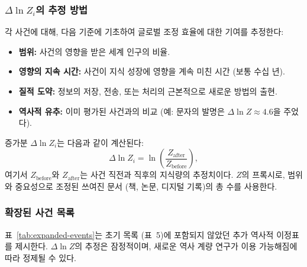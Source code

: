 \documentclass[12pt,a4paper]{article}
\theoremstyle{remark}
\begin{document}
	\subsubsection{\(\Delta \ln Z_i\)의 추정 방법}
	
	각 사건에 대해, 다음 기준에 기초하여 글로벌 조정 효율에 대한 기여를 추정한다:
	\begin{itemize}
		\item \textbf{범위:} 사건의 영향을 받은 세계 인구의 비율.
		\item \textbf{영향의 지속 시간:} 사건이 지식 성장에 영향을 계속 미친 시간 (보통 수십 년).
		\item \textbf{질적 도약:} 정보의 저장, 전송, 또는 처리의 근본적으로 새로운 방법의 출현.
		\item \textbf{역사적 유추:} 이미 평가된 사건과의 비교 (예: 문자의 발명은 \(\Delta \ln Z \approx 4.6\)을 주었다).
	\end{itemize}
	증가분 \(\Delta \ln Z_i\)는 다음과 같이 계산된다:
	\[
	\Delta \ln Z_i = \ln\left(\frac{Z_{\text{after}}}{Z_{\text{before}}}\right),
	\]
	여기서 \(Z_{\text{before}}\)와 \(Z_{\text{after}}\)는 사건 직전과 직후의 지식량의 추정치이다. \(Z\)의 프록시로, 범위와 중요성으로 조정된 쓰여진 문서 (책, 논문, 디지털 기록)의 총 수를 사용한다.
	
	\subsubsection{확장된 사건 목록}
	
	표~\ref{tab:expanded-events}는 초기 목록 (표~5)에 포함되지 않았던 추가 역사적 이정표를 제시한다. \(\Delta \ln Z\)의 추정은 잠정적이며, 새로운 역사 계량 연구가 이용 가능해짐에 따라 정제될 수 있다.
	
\end{document}
